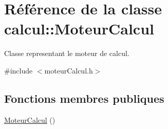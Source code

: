\hypertarget{classcalcul_1_1_moteur_calcul}{\section{Référence de la classe calcul\-:\-:Moteur\-Calcul}
\label{classcalcul_1_1_moteur_calcul}
}


Classe representant le moteur de calcul.  




{\ttfamily \#include $<$moteur\-Calcul.\-h$>$}

\subsection*{Fonctions membres publiques}
\begin{DoxyCompactItemize}
\item 
\hypertarget{classcalcul_1_1_moteur_calcul_abc502459962881c55c52273d0445eb27}{\hyperlink{classcalcul_1_1_moteur_calcul_abc502459962881c55c52273d0445eb27}{Moteur\-Calcul} ()}\label{classcalcul_1_1_moteur_calcul_abc502459962881c55c52273d0445eb27}


\end{DoxyCompactItemize}
